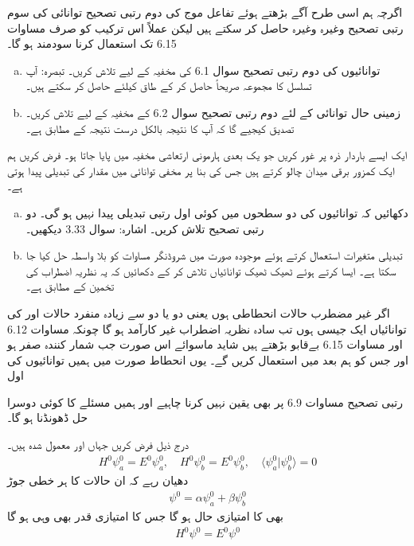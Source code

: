 اگرچہ ہم اسی طرح آگے بڑھتے ہوئے تفاعل موج  کی  دوم رتبی تصحیح   توانائی کی سوم  رتبی تصحیح  وغیرہ وغیرہ حاصل کر سکتے ہیں لیکن عملاً اس ترکیب کو صرف مساوات 6.15 تک استعمال کرنا سودمند  ہو گا۔
\begin{enumerate}[a.]
\item
توانائیوں کی  دوم رتبی  تصحیح   سوال 6.1 کی مخفیہ کے لیے تلاش کریں۔ تبصرہ: آپ تسلسل کا مجموعہ صریحاً حاصل کر کے طاق  کیلئے
  حاصل کر سکتے ہیں۔
\item
زمینی حال توانائی کے لئے دوم رتبی تصحیح   سوال 6.2 کے مخفیہ کے لیے تلاش کریں۔ تصدیق کیجیے گا کہ آپ کا نتیجہ بالکل درست نتیجہ کے مطابق ہے۔ 
\end{enumerate}
ایک ایسے  باردار  ذرہ پر غور کریں جو یک بعدی ہارمونی ارتعاشی مخفیہ  میں پایا جاتا ہو۔ فرض کریں  ہم ایک کمزور برقی میدان  چالو کرتے ہیں جس کی بنا پر مخفی توانائی میں  مقدار کی تبدیلی پیدا ہوتی ہے۔
\begin{enumerate}[a.]
\item
دکھائیں کہ توانائیوں کی  دو سطحوں میں کوئی اول رتبی تبدیلی پیدا نہیں ہو گی۔ دو رتبی تصحیح  تلاش کریں۔ اشارہ: سوال 3.33 دیکھیں۔
\item
تبدیلی متغیرات  استعمال کرتے ہوئے موجودہ صورت میں شروڈنگر مساوات کو بلا واسطہ حل کیا جا سکتا ہے۔ ایسا کرتے ہوئے ٹھیک ٹھیک توانائیاں تلاش کر کے دکھائیں کہ یہ نظریہ اضطراب کی تخمین کے مطابق ہے۔
\end{enumerate}

اگر غیر مضطرب حالات انحطاطی ہوں یعنی دو یا دو سے زیادہ منفرد حالات  اور  کی توانائیاں ایک  جیسی ہوں تب سادہ نظریہ اضطراب غیر کارآمد ہو گا  چونکہ  مساوات 6.12 اور  مساوات 6.15 بےقابو بڑھتے ہیں شاید  ماسوائے اس صورت جب شمار کنندہ صفر ہو  اور جس کو ہم بعد میں استعمال کریں گے۔ یوں  انحطاط صورت میں ہمیں توانائیوں کی اول 

رتبی تصحیح مساوات 6.9 پر بھی یقین نہیں کرنا چاہیے اور ہمیں مسئلے کا کوئی دوسرا حل ڈھونڈنا   ہو گا۔

درج ذیل فرض کریں جہاں  اور  معمول شدہ ہیں۔
\begin{align}
H^0 \psi_a^0 = E^0 \psi_a^0, \quad H^0 \psi_b^0 = E^0 \psi_b^0, \quad \langle \psi_a^0 | \psi_b^0 \rangle = 0
\end{align}
دھیان رہے کہ ان حالات کا ہر خطی جوڑ 
\begin{align}
\psi^0 = \alpha \psi_a^0 + \beta \psi_b^0
\end{align}
بھی  کا امتیازی حال ہو گا جس کا  امتیازی قدر  بھی وہی ہو گا 
\begin{align}
H^0 \psi^0 = E^0 \psi^0
\end{align}

